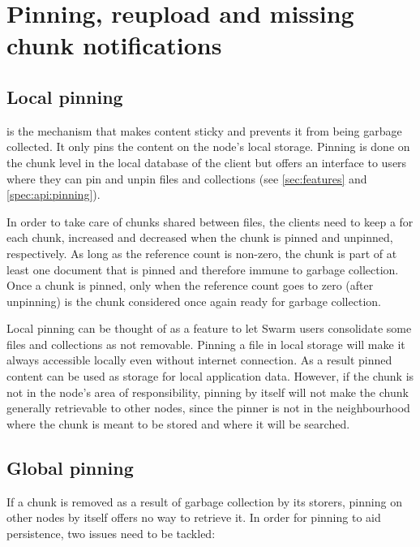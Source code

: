 \section{Pinning, reupload and missing chunk notifications}\label{sec:reupload}


\subsection{Local pinning}\label{sec:pinning}

 is the mechanism that makes content sticky and prevents it from being garbage collected. It only pins the content on the node's local storage. Pinning is done on the chunk level in the local database of the client but offers an interface to users where they can pin and unpin files and collections (see \ref{sec:features} and \ref{spec:api:pinning}). 

In order to take care of chunks shared between files, the clients need to keep a  for each chunk, increased and decreased when the chunk is pinned and unpinned, respectively. As long as the reference count is non-zero, the chunk is part of at least one document that is pinned and therefore immune to garbage collection. Once a chunk is pinned, only when the reference count goes to zero (after unpinning) is the chunk considered once again ready for garbage collection.

Local pinning can be thought of as a feature to let Swarm users consolidate some files and collections as not removable. Pinning a file in local storage will make it always accessible locally even without internet connection. As a result pinned content can be used as storage for local application data. However, if the chunk is not in the node's area of responsibility, pinning by itself will not make the chunk generally retrievable to other nodes, since the pinner is not in the neighbourhood where the chunk is meant to be stored and where it will be searched.

\subsection{Global pinning}\label{sec:global-pinning}

If a chunk is removed as a result of garbage collection by its storers, pinning on other nodes by itself offers no way to retrieve it. In order for pinning to aid persistence, two issues need to be tackled:

